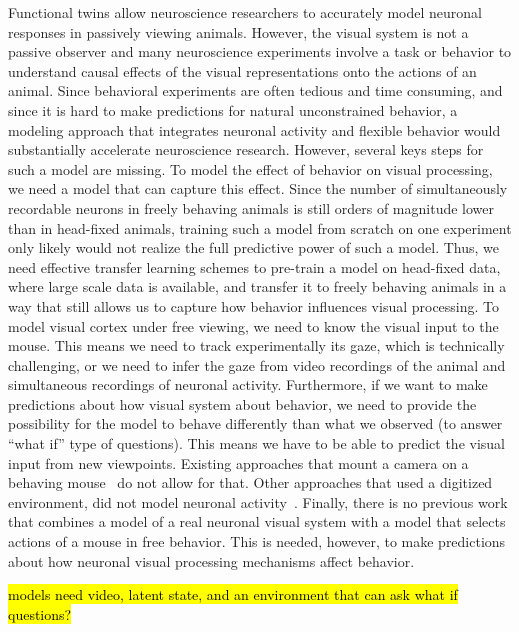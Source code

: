 \documentclass[B2,COG]{ercgrant}
\begin{document}
Functional twins allow neuroscience researchers to accurately model neuronal responses in passively viewing animals. 
However, the visual system is not a passive observer and many neuroscience experiments involve a task or behavior to understand causal effects of the visual representations onto the actions of an animal. 
Since behavioral experiments are often tedious and time consuming, and since it is hard to make predictions for natural unconstrained behavior, a modeling approach that integrates neuronal activity and flexible behavior would substantially accelerate neuroscience research. 
However, several keys steps for such a model are missing. 
To model the effect of behavior on visual processing, we need a model that can capture this effect. 
Since the number of simultaneously recordable neurons in freely behaving animals is still orders of magnitude lower than in head-fixed animals, training such a model from scratch on one experiment only likely would not realize the full predictive power of such a model. 
Thus, we need effective transfer learning schemes to pre-train a model on head-fixed data, where large scale data is available, and transfer it to freely behaving animals in a way that still allows us to capture how behavior influences visual processing. 
To model visual cortex under free viewing, we need to know the visual input to the mouse. 
This means we need to track experimentally its gaze, which is technically challenging, or we need to infer the gaze from video recordings of the animal and simultaneous recordings of neuronal activity. 
Furthermore, if we want to make predictions about how visual system about behavior, we need to provide the possibility for the model to behave differently than what we observed (to answer ``what if'' type of questions). 
This means we have to be able to predict the visual input from new viewpoints.
Existing approaches that mount a camera on a behaving mouse~\parencite{Parker2022-ac} do not allow for that. 
Other approaches that used a digitized environment, did not model neuronal activity~\parencite{Holmgren2021-jv}.
Finally, there is no previous work that combines a model of a real neuronal visual system with a model that selects actions of a mouse in free behavior. 
This is needed, however, to make predictions about how neuronal visual processing mechanisms affect behavior. 

\hl{models need video, latent state, and an environment that can ask what if questions?}

\end{document}
